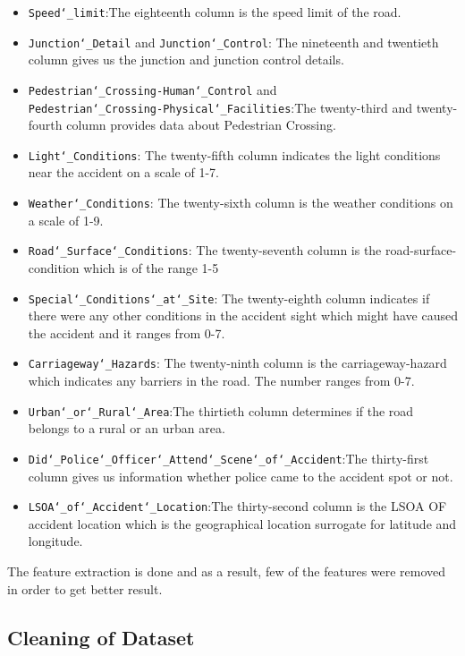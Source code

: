 \documentclass{acm_proc_article-sp}
\begin{document}
\begin{itemize}
    \item \texttt{Speed\char`_limit}:The eighteenth column is the speed limit of the road.
    \item  \texttt{Junction\char`_Detail} and \texttt{Junction\char`_Control}: The nineteenth and twentieth column gives us the junction and junction control details.
    \item \texttt{Pedestrian\char`_Crossing-Human\char`_Control} and \\ \texttt{Pedestrian\char`_Crossing-Physical\char`_Facilities}:The twenty-third and twenty-fourth column provides data about Pedestrian Crossing.
    \item \texttt{Light\char`_Conditions}: The twenty-fifth column indicates the light conditions near the accident on a scale of 1-7.
    \item \texttt{Weather\char`_Conditions}: The twenty-sixth column is the weather conditions on a scale of 1-9.
    \item \texttt{Road\char`_Surface\char`_Conditions}: The twenty-seventh column is the road-surface-condition which is of the range 1-5
    \item \texttt{Special\char`_Conditions\char`_at\char`_Site}: The twenty-eighth column indicates if there were any other conditions in the accident sight which might have caused the accident and it ranges from 0-7.
    \item \texttt{Carriageway\char`_Hazards}: The twenty-ninth column is the carriageway-hazard which indicates any barriers in the road. The number ranges from 0-7.
    \item \texttt{Urban\char`_or\char`_Rural\char`_Area}:The thirtieth column determines if the road belongs to a rural or an urban area.
    \item \texttt{Did\char`_Police\char`_Officer\char`_Attend\char`_Scene\char`_of\char`_Accident}:The thirty-first column gives us information whether police came to the accident spot or not.
    \item \texttt{LSOA\char`_of\char`_Accident\char`_Location}:The thirty-second column is the LSOA OF accident location which is the geographical location surrogate for latitude and longitude. 
\end{itemize}
The feature extraction is done and as a result, few of the features were removed in order to get better result. 

\subsection{Cleaning of Dataset}
\end{document}
